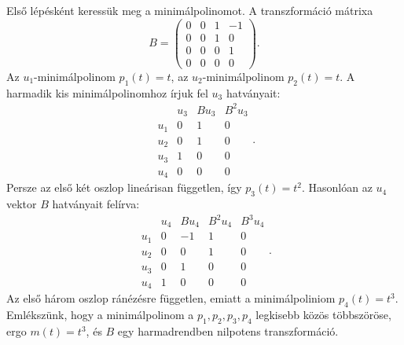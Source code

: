 \documentclass[9pt, a4paper, showtrims]{memoir}
\theoremstyle{plain}
\theoremstyle{remark}
\theoremstyle{definition}
\begin{document}
Első lépésként keressük meg a minimálpolinomot.
A transzformáció mátrixa
\[
    B=
    \begin{pmatrix}
        0&0&1&-1\\
        0&0&1&0\\
        0&0&0&1\\
        0&0&0&0
    \end{pmatrix}.
\]
Az $u_1$-minimálpolinom $p_1\left( t \right)=t$, 
az $u_2$-minimálpolinom $p_2\left( t \right)=t$.
A harmadik kis minimálpolinomhoz írjuk fel $u_3$ hatványait:
\[
\begin{array}{c|cccc}
    & u_3 & Bu_3 & B^2u_3\\
    \hline
    u_1&   0 &    1 &      0\\
    u_2&   0 &    1 &      0\\
    u_3&   1 &    0 &      0\\
    u_4&   0 &    0 &      0
\end{array}.
\]
Persze az első két oszlop lineárisan független, így $p_3\left( t \right)=t^2$.
Hasonlóan az $u_4$ vektor $B$ hatványait felírva:
\[
\begin{array}{c|ccccc}
    & u_4 & Bu_4 & B^2u_4 & B^3u_4\\
    \hline
    u_1&   0 &   -1 &      1 &      0\\
    u_2&   0 &    0 &      1 &      0\\
    u_3&   0 &    1 &      0 &      0\\
    u_4&   1 &    0 &      0 &      0
\end{array}.
\]
Az első három oszlop ránézésre független, emiatt a minimálpoliniom $p_4\left( t \right)=t^3$.
\\
Emlékszünk, hogy a minimálpolinom a $p_1,p_2,p_3,p_4$ legkisebb közös többszöröse,
ergo $m\left( t \right)=t^3$, és $B$ egy harmadrendben nilpotens transzformáció.
\end{document}
